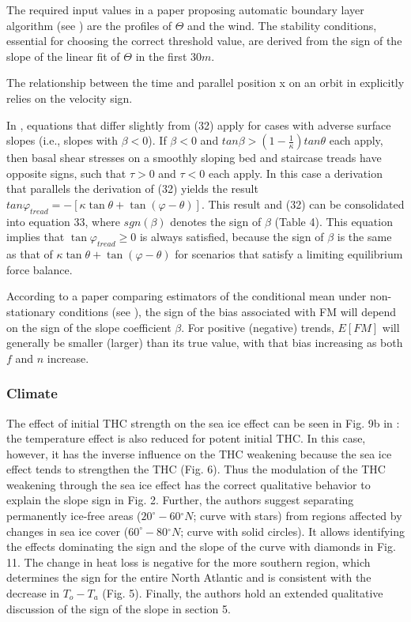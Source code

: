 \documentclass[11pt]{book}
\begin{document}
The required input values in a paper proposing automatic boundary layer algorithm (see \cite{poltera2017pathfinderturb}) are
the profiles of $\Theta$ and the wind. The stability conditions,
essential for choosing the correct threshold value, are derived from
the sign of the slope of the linear fit of $\Theta$ in the first
$30m$.

The relationship between the time and parallel position x on an orbit
in \cite{hutchinson2018prediction} explicitly relies on the velocity
sign.

In \cite{iverson2019basal}, equations that differ slightly from (32)
apply for cases with adverse surface slopes (i.e., slopes with $\beta<0$).
If $\beta<0$ and $tan\beta>\left(1-\frac{1}{\kappa}\right)tan\theta$
each apply, then basal shear stresses on a smoothly sloping bed and
staircase treads have opposite signs, such that $\tau>0$ and $\tau<0$
each apply. In this case a derivation that parallels the derivation
of (32) yields the result $tan\varphi_{tread}=-\left[\kappa\tan\theta+\tan\left(\varphi-\theta\right)\right]$.
This result and (32) can be consolidated into equation 33, where $sgn\left(\beta\right)$
denotes the sign of $\beta$ (Table 4). This equation implies that
$\tan\varphi_{tread}\geq0$ is always satisfied, because the sign
of $\beta$ is the same as that of $\kappa\tan\theta+\tan(\varphi-\theta)$
for scenarios that satisfy a limiting equilibrium force balance.

According to a paper comparing estimators of the conditional
mean under non-stationary conditions (see \cite{vogel2020comparison}), the sign of the bias
associated with FM will depend on the sign of the slope coefficient
$\beta$. For positive (negative) trends, $E\left[FM\right]$ will
generally be smaller (larger) than its true value, with that bias
increasing as both $f$ and $n$ increase.


\subsubsection{Climate}

The effect of initial THC strength on the sea ice effect can be seen
in Fig. 9b in \cite{levermann2007role}: the temperature effect is
also reduced for potent initial THC. In this case, however, it has
the inverse influence on the THC weakening because the sea ice effect
tends to strengthen the THC (Fig. 6). Thus the modulation of the THC
weakening through the sea ice effect has the correct qualitative behavior
to explain the slope sign in Fig. 2. Further, the authors suggest
separating permanently ice-free areas ($20^{\circ}-60{}^{\circ}N$;
curve with stars) from regions affected by changes in sea ice cover
($60^{\circ}-80{}^{\circ}N$; curve with solid circles). It allows
identifying the effects dominating the sign and the slope of the curve
with diamonds in Fig. 11. The change in heat loss is negative for
the more southern region, which determines the sign for the entire
North Atlantic and is consistent with the decrease in $T_{o}-T_{a}$
(Fig. 5). Finally, the authors hold an extended qualitative discussion
of the sign of the slope in section 5.
\end{document}
